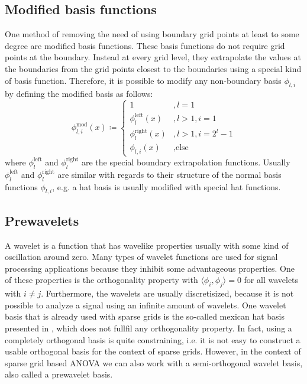 \documentclass[
  a4paper,  %
  twoside,  %
  bibliography=totoc,
  headsepline,
  cleardoublepage=empty,
  parskip=half,
  draft=false
]{scrbook}
\begin{document}
\subsection{Modified basis functions}

One method of removing the need of using boundary grid points at least to some degree are modified basis functions.
These basis functions do not require grid points at the boundary.
Instead at every grid level, they extrapolate the values at the boundaries from the grid points closest to the boundaries using a special kind of basis function.
Therefore, it is possible to modify any non-boundary basis $\phi_{l,i}$ by defining the modified basis as follows:
\begin{equation}
\phi^{\text{mod}}_{l,i}(x) \coloneqq
\begin{cases}
1 &, l=1\\
\phi^{\text{left}}_{l}(x)&, l>1, i=1\\
\phi^{\text{right}}_{l}(x)&, l>1, i=2^l - 1\\
\phi_{l,i}(x)&, \text{else}
\end{cases}
\nonumber
\end{equation}
where $\phi^{\text{left}}_{l}$ and $\phi^{\text{right}}_{l}$ are the special boundary extrapolation functions.
Usually $\phi^{\text{left}}_{l}$ and $\phi^{\text{right}}_{l}$ are similar with regards to their structure of the normal basis functions $\phi_{l,i}$, e.g. a hat basis is usually modified with special hat functions.






\subsection{Prewavelets}

A wavelet is a function that has wavelike properties usually with some kind of oscillation around zero.
Many types of wavelet functions are used for signal processing applications because they inhibit some advantageous properties.
One of these properties is the orthogonality property with $\langle \phi_{i},\phi_{j} \rangle = 0$ for all wavelets with $i \neq j$.
Furthermore,  the wavelets are usually discretisized, because it is not possible to analyze a signal using an infinite amount of wavelets.
One wavelet basis that is already used with sparse grids is the so-called mexican hat basis presented in \cite{}, which does not fullfil any orthogonality property.
In fact, using a completely orthogonal basis is quite constraining, i.e. it is not easy to construct a usable orthogonal basis for the context of sparse grids.
However, in the context of sparse grid based ANOVA we can also work with a semi-orthogonal wavelet basis, also called a prewavelet basis.
\end{document}
